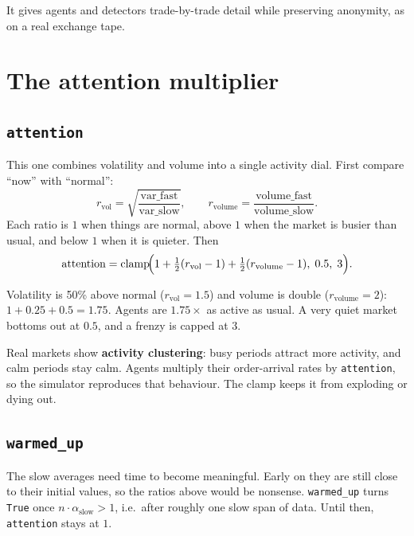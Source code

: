 \documentclass[11pt,a4paper]{article}
\newcommand{\code}[1]{\texttt{#1}}
\begin{document}
\begin{whyuse}
It gives agents and detectors trade-by-trade detail while preserving anonymity, as on a real exchange
tape.
\end{whyuse}

\section{The attention multiplier}
\label{sec:attention}

\subsection{\code{attention}}
This one combines volatility and volume into a single activity dial. First compare ``now'' with
``normal'':
\[
  r_{\text{vol}} = \sqrt{\frac{\text{var\_fast}}{\text{var\_slow}}},
  \qquad
  r_{\text{volume}} = \frac{\text{volume\_fast}}{\text{volume\_slow}}.
\]
Each ratio is $1$ when things are normal, above $1$ when the market is busier than usual, and below
$1$ when it is quieter. Then
\[
  \text{attention} = \operatorname{clamp}\!\Bigl(1 + \tfrac12(r_{\text{vol}}-1) + \tfrac12(r_{\text{volume}}-1),\; 0.5,\; 3\Bigr).
\]

\begin{example}
Volatility is 50\% above normal ($r_{\text{vol}}=1.5$) and volume is double ($r_{\text{volume}}=2$):
$1 + 0.25 + 0.5 = 1.75$. Agents are $1.75\times$ as active as usual. A very quiet market bottoms out
at $0.5$, and a frenzy is capped at $3$.
\end{example}

\begin{whyuse}
Real markets show \textbf{activity clustering}: busy periods attract more activity, and calm periods
stay calm. Agents multiply their order-arrival rates by \code{attention}, so the simulator reproduces
that behaviour. The clamp keeps it from exploding or dying out.
\end{whyuse}

\subsection{\code{warmed\_up}}
The slow averages need time to become meaningful. Early on they are still close to their initial
values, so the ratios above would be nonsense. \code{warmed\_up} turns \code{True} once
$n\cdot\alpha_{\text{slow}}>1$, i.e.\ after roughly one slow span of data. Until then, \code{attention}
stays at $1$.
\end{document}

